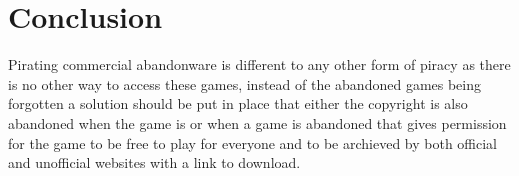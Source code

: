 \documentclass{scrartcl}
\begin{document}
\section*{Conclusion}

Pirating commercial abandonware is different to any other form of piracy as there is no other way to access these games, instead of the abandoned games being forgotten a solution should be put in place that either the copyright is also abandoned when the game is or when a game is abandoned that gives permission for the game to be free to play for everyone and to be archieved by both official and unofficial websites with a link to download.



\end{document}
